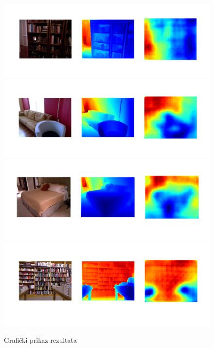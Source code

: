 \documentclass[times, utf8, zavrsni, numeric]{fer}
\begin{document}
\begin{figure}[htb]
	\centering
	\includegraphics[scale=0.3]{test1.png}
	\includegraphics[scale=0.3]{test2.png}
	\includegraphics[scale=0.3]{test3.png}
	\includegraphics[scale=0.3]{test4.png}
	\caption{Grafički prikaz rezultata}
	\label{fig:res}
\end{figure}
\end{document}
